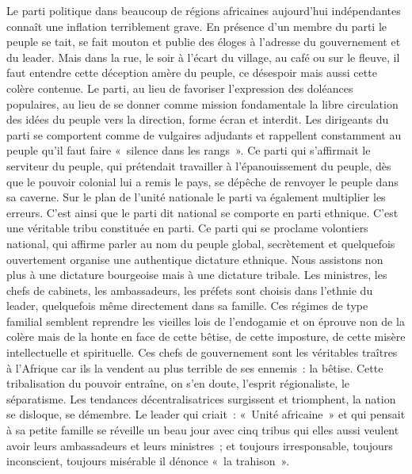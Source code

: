 \documentclass[french,twoside]{book} %
\begin{document}
\bigbreak
\noindent Le parti politique dans beaucoup de régions africaines aujourd’hui indépendantes connaît une inflation terriblement grave. En présence d’un membre du parti le peuple se tait, se   fait mouton et publie des éloges à l’adresse du gouvernement et du leader. Mais dans la rue, le soir à l’écart du village, au café ou sur le fleuve, il faut entendre cette déception amère du peuple, ce désespoir mais aussi cette colère contenue. Le parti, au lieu de favoriser l’expression des doléances populaires, au lieu de se donner comme mission fondamentale la libre circulation des idées du peuple vers la direction, forme écran et interdit. Les dirigeants du parti se comportent comme de vulgaires adjudants et rappellent constamment au peuple qu’il faut faire « silence dans les rangs ». Ce parti qui s’affirmait le serviteur du peuple, qui prétendait travailler à l’épanouissement du peuple, dès que le pouvoir colonial lui a remis le pays, se dépêche de renvoyer le peuple dans sa caverne. Sur le plan de l’unité nationale le parti va également multiplier les erreurs. C’est ainsi que le parti dit national se comporte en parti ethnique. C’est une véritable tribu constituée en parti. Ce parti qui se proclame volontiers national, qui affirme parler au nom du peuple global, secrètement et quelquefois ouvertement organise une authentique dictature ethnique. Nous assistons non plus à une dictature bourgeoise mais à une dictature tribale. Les ministres, les chefs de cabinets, les ambassadeurs, les préfets sont choisis dans l’ethnie du leader, quelquefois même directement dans sa famille. Ces régimes de type familial semblent reprendre les vieilles lois de l’endogamie et on éprouve non de la colère mais de la honte en face de cette bêtise, de cette imposture, de cette misère intellectuelle et spirituelle. Ces chefs de gouvernement sont les véritables traîtres à l’Afrique car ils la vendent au plus terrible de ses ennemis : la bêtise. Cette tribalisation du pouvoir entraîne, on s’en doute, l’esprit régionaliste, le séparatisme. Les tendances décentralisatrices surgissent et triomphent, la nation se disloque, se démembre. Le leader qui criait : « Unité africaine » et qui pensait à sa petite famille se réveille un beau jour avec cinq tribus qui elles aussi veulent avoir leurs ambassadeurs et leurs ministres ; et toujours irresponsable, toujours inconscient, toujours misérable il dénonce « la trahison ».\par
\end{document}
